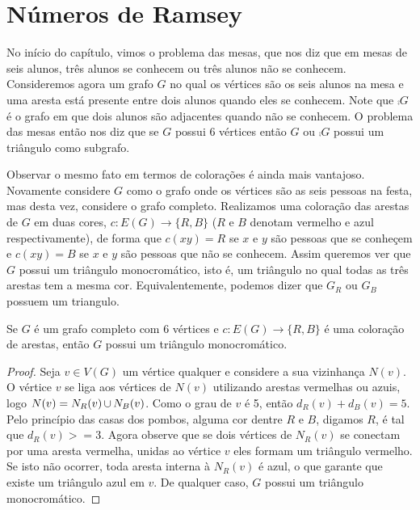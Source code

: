 
\section{Números de Ramsey}

No início do capítulo, vimos o problema das mesas, que nos diz que em mesas de seis alunos, três alunos se conhecem ou três alunos não se conhecem. Consideremos agora um grafo $G$ no qual os vértices são os seis alunos na mesa e uma aresta está presente entre dois alunos quando eles se conhecem. Note que $\comp{G}$ é o grafo em que dois alunos são adjacentes quando não se conhecem. O problema das mesas então nos diz que se $G$ possui 6 vértices então $G$ ou $\comp{G}$ possui um triângulo como subgrafo.

Observar o mesmo fato em termos de colorações é ainda mais vantajoso. Novamente considere $G$ como o grafo onde os vértices são as seis pessoas na festa, mas desta vez, considere o grafo completo. Realizamos uma coloração das arestas de $G$ em duas cores, $c: E(G) \to \{ R,B \}$ ($R$ e $B$ denotam vermelho e azul respectivamente), de forma que $c(xy) = R$ se $x$ e $y$ são pessoas que se conheçem e $c(xy) = B$ se $x$ e $y$ são pessoas que não se conhecem. Assim queremos ver que $G$ possui um triângulo monocromático, isto é, um triângulo no qual todas as três arestas tem a mesma cor. Equivalentemente, podemos dizer que $G_R$ ou $G_B$ possuem um triangulo.

\begin{proposition}
\label{thm:r3}
Se $G$ é um grafo completo com 6 vértices e $c: E(G) \to \{ R,B\}$ é uma coloração de arestas, então $G$ possui um triângulo monocromático.
\end{proposition}
\begin{proof}
Seja $v \in V(G)$ um vértice qualquer e considere a sua vizinhança $N(v)$. O vértice $v$ se liga aos vértices de $N(v)$ utilizando arestas vermelhas ou azuis, logo $N(v) = N_R(v) \operatorname{\cup} N_B(v)$. Como o grau de $v$ é 5, então $d_R(v) + d_B(v) = 5$. Pelo princípio das casas dos pombos, alguma cor dentre $R$ e $B$, digamos $R$, é tal que $d_R(v) >= 3$. Agora observe que se dois vértices de $N_R(v)$ se conectam por uma aresta vermelha, unidas ao vértice $v$ eles formam um triângulo vermelho. Se isto não ocorrer, toda aresta interna à $N_R(v)$ é azul, o que garante que existe um triângulo azul em $v$. De qualquer caso, $G$ possui um triângulo monocromático.
\end{proof}

